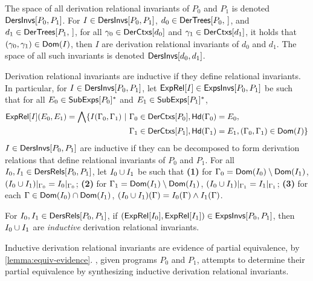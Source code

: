 %
The space of all derivation relational invariants of $P_0$ and $P_1$
is denoted $\mathsf{DersInvs}[  P_0 ,  P_1  ]$.
%
For $I \in \mathsf{DersInvs}[  P_0 ,  P_1  ]$, $d_0 \in \dertrees{P_0}$, and
$d_1 \in \dertrees{P_1}$, for all $\gamma_0 \in \mathsf{DerCtxs}[ d_0 ]$ and
$\gamma_1 \in \mathsf{DerCtxs}[  d_1  ]$, it holds that $(\gamma_0, \gamma_1)
\in \mathsf{Dom}(I)$, then $I$ are derivation relational invariants of
$d_0$ and $d_1$.
%
The space of all such invariants is denoted $\mathsf{DersInvs}[  d_0 ,  d_1  ]$.

%
%

Derivation relational invariants are inductive if they define
relational invariants.
%
In particular, for $I \in \mathsf{DersInvs}[ P_0, P_1 ]$, let $\mathsf{ExpRel}[ I ] \in
\mathsf{ExpsInvs}[ P_0, P_1 ]$ be such that for all $E_0 \in \mathsf{SubExps}[ P_0 ]^{*}$
and $E_1 \in \mathsf{SubExps}[ P_1 ]^{*}$,
\begin{align*}
  \exprel{I}(E_0, E_1) = %
  \bigland \setformer{ I(\Gamma_0, \Gamma_1) }{ %
    & \Gamma_0 \in \derctxs{ P_0 }, \headexps(\Gamma_0) = E_0, \\ %
    & \Gamma_1 \in \derctxs{ P_1 }, \headexps(\Gamma_1) = E_1, %
    (\Gamma_0, \Gamma_1) \in \domain(I) } 
\end{align*}
%
$I \in \mathsf{DersInvs}[ P_0, P_1 ]$ are inductive if they can be decomposed to
form derivation relations that define relational invariants of $P_0$
and $P_1$.
%
For all $I_0, I_1 \in \mathsf{DersRels}[ P_0, P_1 ]$, let $I_0 \cup I_1$ 
be such that 
\textbf{(1)} for $\Gamma_0 = \mathsf{Dom}(I_0) \setminus \mathsf{Dom}(I_1)$,
$(I_0 \cup I_1)|_{ \Gamma_0 } = I_0|_{ \Gamma_0
}$;
\textbf{(2)} for $\Gamma_1 = \mathsf{Dom}(I_1) \setminus \mathsf{Dom}(I_1)$,
$(I_0 \cup I_1)|_{ \Gamma_1 } = I_1|_{ \Gamma_1
}$;
\textbf{(3)} for each $\Gamma \in \mathsf{Dom}(I_0) \cap
\mathsf{Dom}(I_1)$, $(I_0 \cup I_1)(\Gamma) = I_0(\Gamma) \land
I_1(\Gamma)$.
%
\begin{defn}
  \label{defn:inductive-der-rels}
  For $I_0, I_1 \in \mathsf{DersRels}[ P_0, P_1 ]$, %
  if $(\mathsf{ExpRel}[ I_0 ], \mathsf{ExpRel}[ I_1 ]) \in \mathsf{ExpsInvs}[ P_0, P_1 ]$, then %
  $I_0 \cup I_1$ are \emph{inductive} derivation relational
  invariants.
\end{defn}
%
Inductive derivation relational invariants are evidence of partial
equivalence, by \autoref{lemma:equiv-evidence}.
%
\sys, given programs $P_0$ and $P_1$, attempts to determine their
partial equivalence by synthesizing inductive derivation relational
invariants.

